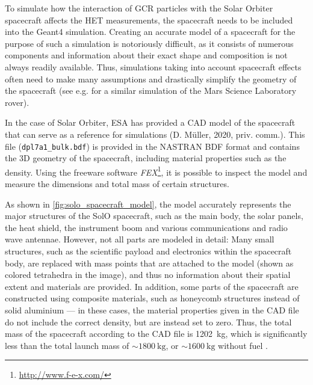 To simulate how the interaction of \ac{GCR} particles with the Solar Orbiter spacecraft affects the \ac{HET} measurements, the spacecraft needs to be included into the \ac{Geant4} simulation. Creating an accurate model of a spacecraft for the purpose of such a simulation is notoriously difficult, as it consists of numerous components and information about their exact shape and composition is not always readily available. Thus, simulations taking into account spacecraft effects often need to make many assumptions and drastically simplify the geometry of the spacecraft (see e.g. \citet{Appel-2018-PhD,Appel-2018} for a similar simulation of the Mars Science Laboratory rover).

In the case of Solar Orbiter, ESA has provided a \ac{CAD} model of the spacecraft that can serve as a reference for simulations (D. Müller, 2020, priv. comm.). This file (\texttt{dpl7a1\_bulk.bdf}) is provided in the NASTRAN BDF format
and contains the 3D geometry of the spacecraft, including material properties such as the density. Using the freeware software \textit{FEX}\footnote{\url{http://www.f-e-x.com/}}, it is possible to inspect the model and measure the dimensions and total mass of certain structures.

As shown in \autoref{fig:solo_spacecraft_model}, the model accurately represents the major structures of the SolO spacecraft, such as the main body, the solar panels, the heat shield, the instrument boom and various communications and radio wave antennae. However, not all parts are modeled in detail: Many small structures, such as the scientific payload and electronics within the spacecraft body, are replaced with mass points that are attached to the model (shown as colored tetrahedra in the image), and thus no information about their spatial extent and materials are provided. In addition, some parts of the spacecraft are constructed using composite materials, such as honeycomb structures instead of solid aluminium --- in these cases, the material properties given in the \ac{CAD} file do not include the correct density, but are instead set to zero. Thus, the total mass of the spacecraft according to the \ac{CAD} file is \SI{1202}{\kilogram}, which is significantly less than the total launch mass of $\sim\SI{1800}{\kilo\gram}$, or $\sim\SI{1600}{\kilo\gram}$ without fuel \citep{Mueller-2020-SolO}.


